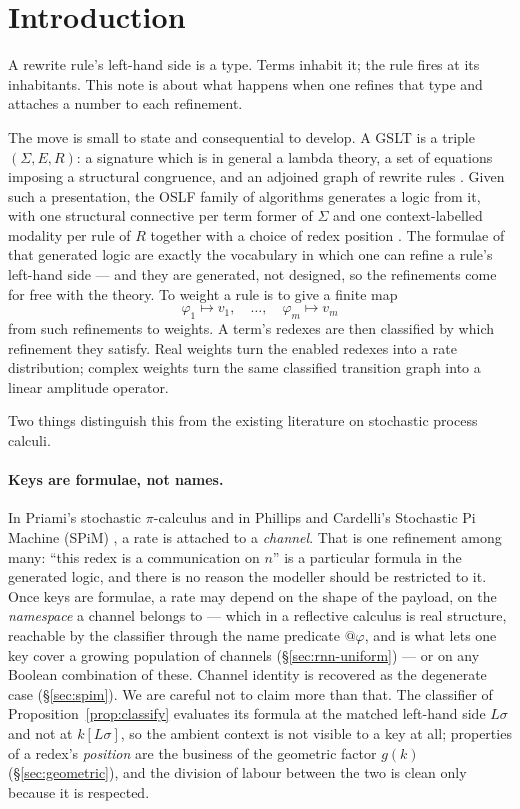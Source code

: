 \documentclass[11pt,a4paper]{article}
\theoremstyle{plain}
\theoremstyle{definition}
\theoremstyle{remark}
\newcommand{\gfac}{g}
\begin{document}
\tableofcontents

\section{Introduction}
\label{sec:intro}

A rewrite rule's left-hand side is a type. Terms inhabit it; the rule fires at its inhabitants. This
note is about what happens when one refines that type and attaches a number to each refinement.

The move is small to state and consequential to develop. A GSLT is a triple $(\Sigma, E, R)$: a
signature which is in general a lambda theory, a set of equations imposing a structural congruence,
and an adjoined graph of rewrite rules \cite{omnibus}. Given such a presentation, the OSLF family of
algorithms generates a logic from it, with one structural connective per term former of $\Sigma$ and
one context-labelled modality per rule of $R$ together with a choice of redex position
\cite{omnibus,classifier}. The formulae of that generated logic are exactly the vocabulary in which
one can refine a rule's left-hand side --- and they are generated, not designed, so the refinements
come for free with the theory. To weight a rule is to give a finite map
\[
\varphi_1 \mapsto v_1, \quad \ldots, \quad \varphi_m \mapsto v_m
\]
from such refinements to weights. A term's redexes are then classified by which refinement they
satisfy. Real weights turn the enabled redexes into a rate distribution; complex weights turn the
same classified transition graph into a linear amplitude operator.

Two things distinguish this from the existing literature on stochastic process calculi.

\paragraph{Keys are formulae, not names.} In Priami's stochastic $\pi$-calculus \cite{priami} and in
Phillips and Cardelli's Stochastic Pi Machine (SPiM) \cite{spim,spim-sim}, a rate is attached to a
\emph{channel}. That is one refinement among many: ``this redex is a communication on $n$'' is a
particular formula in the generated logic, and there is no reason the modeller should be restricted
to it. Once keys are formulae, a rate may depend on the shape of the payload, on the \emph{namespace}
a channel belongs to --- which in a reflective calculus is real structure, reachable by the classifier
through the name predicate $@\varphi$, and is what lets one key cover a growing population of
channels (\S\ref{sec:rnn-uniform}) --- or on any Boolean combination of these. Channel identity is
recovered as the degenerate case (\S\ref{sec:spim}). We are careful not to claim more than that. The
classifier of Proposition~\ref{prop:classify} evaluates its formula at the matched left-hand side
$L\sigma$ and not at $k[L\sigma]$, so the ambient context is not visible to a key at all; properties
of a redex's \emph{position} are the business of the geometric factor $\gfac(k)$ (\S\ref{sec:geometric}),
and the division of labour between the two is clean only because it is respected.
\end{document}
